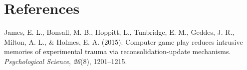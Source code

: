 \documentclass[man]{apa6}
\begin{document}
\section{References}\label{references}

\begingroup
\setlength{\parindent}{-0.5in} \setlength{\leftskip}{0.5in}

\hypertarget{refs}{}
\hypertarget{ref-james2015computer}{}
James, E. L., Bonsall, M. B., Hoppitt, L., Tunbridge, E. M., Geddes, J.
R., Milton, A. L., \& Holmes, E. A. (2015). Computer game play reduces
intrusive memories of experimental trauma via reconsolidation-update
mechanisms. \emph{Psychological Science}, \emph{26}(8), 1201--1215.

\endgroup
\end{document}

